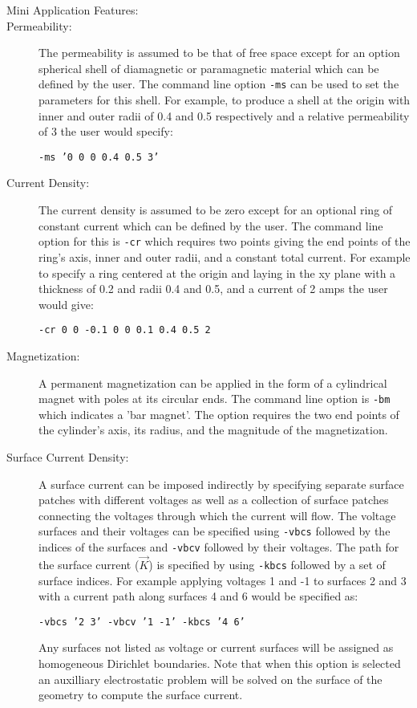 \documentclass{article}
\begin{document}
\begin{description}
\item[Mini Application Features:]
\item[Permeability:] The permeability is assumed to be that of free
  space except for an option spherical shell of diamagnetic or
  paramagnetic material which can be defined by the user.  The command
  line option {\tt -ms} can be used to set the parameters for this
  shell.  For example, to produce a shell at the origin with inner and
  outer radii of 0.4 and 0.5 respectively and a relative permeability
  of 3 the user would specify:
  \begin{center}{\tt -ms '0 0 0 0.4 0.5 3'}\end{center}

\item[Current Density:] The current density is assumed to be zero
  except for an optional ring of constant current which can be defined
  by the user.  The command line option for this is {\tt -cr} which
  requires two points giving the end points of the ring's axis, inner
  and outer radii, and a constant total current.  For example to
  specify a ring centered at the origin and laying in the xy plane
  with a thickness of 0.2 and radii 0.4 and 0.5, and a current of 2
  amps the user would give:
  \begin{center}{\tt -cr 0 0 -0.1 0 0 0.1 0.4 0.5 2}\end{center} 

\item[Magnetization:] A permanent magnetization can be applied in the
  form of a cylindrical magnet with poles at its circular ends.  The
  command line option is {\tt -bm} which indicates a 'bar magnet'.
  The option requires the two end points of the cylinder's axis, its
  radius, and the magnitude of the magnetization.

\item[Surface Current Density:] A surface current can be imposed
  indirectly by specifying separate surface patches with different
  voltages as well as a collection of surface patches connecting the
  voltages through which the current will flow.  The voltage surfaces
  and their voltages can be specified using {\tt -vbcs} followed by
  the indices of the surfaces and {\tt -vbcv} followed by their
  voltages.  The path for the surface current ($\vec{K}$) is specified
  by using {\tt -kbcs} followed by a set of surface indices.  For
  example applying voltages 1 and -1 to surfaces 2 and 3 with a
  current path along surfaces 4 and 6 would be specified as:
  \begin{center}{\tt -vbcs '2 3' -vbcv '1 -1' -kbcs '4 6'}\end{center}
  Any surfaces not listed as voltage or current surfaces will be
  assigned as homogeneous Dirichlet boundaries.  Note that when this
  option is selected an auxilliary electrostatic problem will be
  solved on the surface of the geometry to compute the surface
  current.


\end{description}
\end{document}
